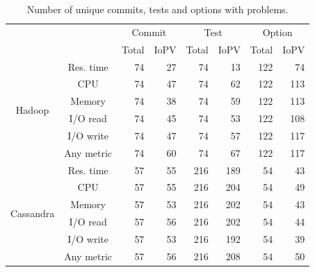 \begin{table}[t]
    \centering
    \caption{Number of unique commits, tests and options with \inconsistent problems.} %
    \begin{tabular}{|c|c|r|r|r|r|r|r|}
    \hline
    \multirow{2}{*}{}          & \multirow{2}{*}{} & \multicolumn{2}{c|}{Commit}      & \multicolumn{2}{c|}{Test}        & \multicolumn{2}{c|}{Option}      \\ \cline{3-8} 
         &                   & \multicolumn{1}{c|}{Total} & \multicolumn{1}{c|}{IoPV} & \multicolumn{1}{c|}{Total} & \multicolumn{1}{c|}{IoPV} & \multicolumn{1}{c|}{Total} & \multicolumn{1}{c|}{IoPV} \\ \hline
    \multirow{6}{*}{Hadoop}    & Res. time         & 74   & 27  & 74   & 13  & 122  & 74  \\ \cline{2-8} 
         & CPU               & 74   & 47  & 74   & 62  & 122  & 113 \\ \cline{2-8} 
         & Memory            & 74   & 38  & 74   & 59  & 122  & 113 \\ \cline{2-8} 
         & I/O read          & 74   & 45  & 74   & 53  & 122  & 108 \\ \cline{2-8} 
         & I/O write         & 74   & 47  & 74   & 57  & 122  & 117 \\ \cline{2-8} 
         & Any metric        & 74   & 60  & 74   & 67  & 122  & 117 \\ \hline
    \multirow{6}{*}{Cassandra} & Res. time         & 57   & 55  & 216  & 189 & 54   & 43  \\ \cline{2-8} 
         & CPU               & 57   & 55  & 216  & 204 & 54   & 49  \\ \cline{2-8} 
         & Memory            & 57   & 53  & 216  & 202 & 54   & 43  \\ \cline{2-8} 
         & I/O read          & 57   & 56  & 216  & 202 & 54   & 44  \\ \cline{2-8} 
         & I/O write         & 57   & 53  & 216  & 192 & 54   & 39  \\ \cline{2-8} 
         & Any metric        & 57   & 56  & 216  & 208 & 54   & 50  \\ \hline
    \end{tabular}
    \label{tab:dimemssion_regression}
\end{table}


